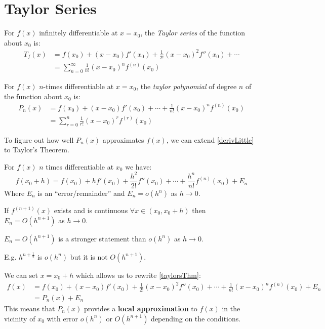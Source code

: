 \documentclass[../main.tex]{subfiles}
\begin{document}
\section{Taylor Series}
\begin{definition}
 For $f(x)$ infinitely differentiable at $x = x_0$, the \textit{Taylor series} of the function about $x_0$ is:
 \begin{align*}
   T_f(x) &= f(x_0) + (x - x_0)f'(x_0) + \frac{1}{2!}(x - x_0)^2 f''(x_0) + \cdots \\
          &= \sum_{n=0}^{\infty} \frac{1}{n!} (x-x_0)^{n} f^{(n)}(x_0)
 \end{align*}
\end{definition}
\begin{definition}
  For $f(x)$ $n$-times differentiable at $x = x_0$, the \textit{taylor polynomial} of degree $n$ of the function about $x_0$ is:
  \begin{align*}
    P_n(x) &= f(x_0) + (x - x_0)f'(x_0) + \cdots + \frac{1}{n!} (x - x_0)^{n} f^{(n)}(x_0) \\
           &= \sum_{r=0}^{n} \frac{1}{r!} (x-x_0)^{r} f^{(r)}(x_0)
  \end{align*}
\end{definition}
To figure out how well $P_n(x)$ approximates $f(x)$, we can extend \cref{derivLittle} to Taylor's Theorem.
\begin{theorem}
  For $f(x)$ $n$ times differentiable at $x_0$ we have:
  \[
    f(x_0 + h) = f(x_0) + hf'(x_0) + \frac{h^2}{2!}f''(x_0) + \cdots + \frac{h^{n}}{n!} f^{(n)} (x_0) + E_n
  \]
  Where $E_n$ is an ``error/remainder'' and $E_n = o(h^{n})$ as $h \to 0$.

  If $f^{(n+1)}(x)$ exists and is continuous $\forall x \in (x_0, x_0 + h)$ then $E_n = O(h^{n+1})$ as $h \to 0$.
  \label{taylorsThm}
\end{theorem}
\begin{remark}
  $E_n = O(h^{n + 1})$ is  a stronger statement than $o(h^{n})$ as $h \to 0$.

  E.g. $h^{n + \frac{1}{2}}$ is $o(h^{n})$ but it is not $O(h^{n + 1})$.
\end{remark}
We can set $x = x_0 + h$ which allows us to rewrite \cref{taylorsThm}:
\begin{align*}
  f(x) &= f(x_0) + (x - x_0)f'(x_0) + \frac{1}{2!}(x - x_0)^2f''(x_0) + \cdots + \frac{1}{n!}(x - x_0)^{n} f^{(n)}(x_0) + E_n \\
       &= P_n(x) + E_n
\end{align*}
This means that $P_n(x)$ provides a \textbf{local approximation} to $f(x)$ in the vicinity of $x_0$ with error $o(h^{n})$ or $O(h^{n + 1})$ depending on the conditions.
\end{document}
